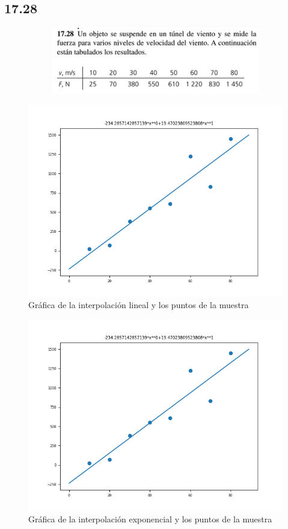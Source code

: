 \documentclass[12pt,oneside,FLEQN]{report}
\begin{document}
{		\subsection{17.28}
			\begin{figure}[!h]
			\begin{figure}[!h]
				\centering
				\includegraphics[scale=0.5]{1728e.png}
				\caption{}
			\end{figure}
				\centering
				\includegraphics[scale=0.3]{17281.png}
				\caption{Gráfica de la interpolación lineal y los puntos de la muestra}
			\end{figure}
			\begin{figure}[!h]
				\centering
				\includegraphics[scale=0.3]{17281.png}
				\caption{Gráfica de la interpolación exponencial y los puntos de la muestra}
			\end{figure}

}
\end{document}
